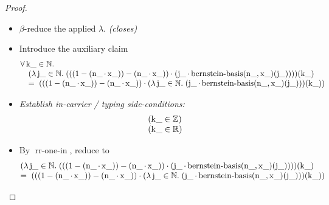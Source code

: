 \documentclass[11pt]{article}
\theoremstyle{plain}
\begin{document}
\begin{proof}
\begin{itemize}[leftmargin=2.8em, itemsep=4pt, parsep=1pt]
  \item[\textbf{98--99}] $\beta$-reduce the applied $\lambda$.  \emph{(closes)}
  \item[\textbf{100}] Introduce the auxiliary claim
\begin{equation*}
\begin{array}{@{}l@{}} \forall \operatorname{k\_} \in \mathbb{N}. \\ \quad (\lambda \operatorname{j\_} \in \mathbb{N}.\; (((1 - (\operatorname{n\_} \cdot \operatorname{x\_})) - (\operatorname{n\_} \cdot \operatorname{x\_})) \cdot (\operatorname{j\_} \cdot \operatorname{bernstein\text{-}basis}(\operatorname{n\_}, \operatorname{x\_})(\operatorname{j\_}))))(\operatorname{k\_}) \\ \quad =\; (((1 - (\operatorname{n\_} \cdot \operatorname{x\_})) - (\operatorname{n\_} \cdot \operatorname{x\_})) \cdot (\lambda \operatorname{j\_} \in \mathbb{N}.\; (\operatorname{j\_} \cdot \operatorname{bernstein\text{-}basis}(\operatorname{n\_}, \operatorname{x\_})(\operatorname{j\_})))(\operatorname{k\_})) \end{array}
\end{equation*}

  \item[\textbf{101--103}] \emph{Establish in-carrier / typing side-conditions:}
\begin{equation*}
\begin{array}{@{}l@{}}
(\operatorname{k\_} \in \mathbb{Z}) \\
(\operatorname{k\_} \in \mathbb{R})
\end{array}
\end{equation*}

  \item[\textbf{104}] By $\operatorname{rr\text{-}one\text{-}in}$, reduce to
\begin{equation*}
\begin{array}{@{}l@{}} (\lambda \operatorname{j\_} \in \mathbb{N}.\; (((1 - (\operatorname{n\_} \cdot \operatorname{x\_})) - (\operatorname{n\_} \cdot \operatorname{x\_})) \cdot (\operatorname{j\_} \cdot \operatorname{bernstein\text{-}basis}(\operatorname{n\_}, \operatorname{x\_})(\operatorname{j\_}))))(\operatorname{k\_}) \\ =\; (((1 - (\operatorname{n\_} \cdot \operatorname{x\_})) - (\operatorname{n\_} \cdot \operatorname{x\_})) \cdot (\lambda \operatorname{j\_} \in \mathbb{N}.\; (\operatorname{j\_} \cdot \operatorname{bernstein\text{-}basis}(\operatorname{n\_}, \operatorname{x\_})(\operatorname{j\_})))(\operatorname{k\_})) \end{array}
\end{equation*}


\end{itemize}
\end{proof}
\end{document}
